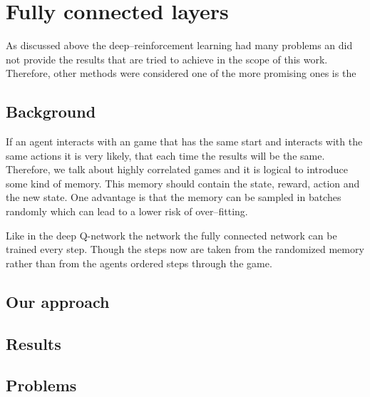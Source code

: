 \chapter{Fully connected layers}
As discussed above the deep--reinforcement learning had many problems an did not provide the results that are tried to achieve in the scope of this work.
Therefore, other methods were considered one of the more promising ones is the %

\section{Background}
If an agent interacts with an game that has the same start and interacts with the same actions it is very likely, that each time the results will be the same. 
Therefore, we talk about highly correlated games and it is logical to introduce some kind of memory. 
This memory should contain the state, reward, action and the new state. 
One advantage is that the memory can be sampled in batches randomly which can lead to a lower risk of over--fitting.

Like in the deep Q-network the network the fully connected network can be trained every step. 
Though the steps now are taken from the randomized memory rather than from the agents ordered steps through the game.

\section{Our approach}

\section{Results}

\section{Problems}
